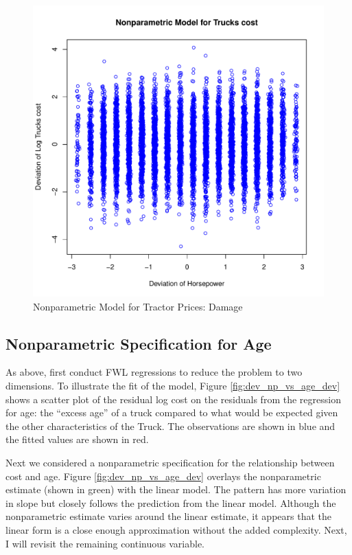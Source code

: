 \documentclass[11pt]{paper}
\begin{document}
\begin{figure}[h!]
  \centering
  \includegraphics[scale = 0.5, keepaspectratio=true]{../Figures/dev_np_vs_damage_dev}
  \caption{Nonparametric Model for Tractor Prices: Damage} \label{fig:dev_np_vs_damage_dev}
\end{figure}

 
\clearpage



\subsection{Nonparametric Specification for Age}

As above, first conduct FWL regressions 
to reduce the problem to two dimensions. 
% 
To illustrate the fit of the model, 
Figure \ref{fig:dev_np_vs_age_dev} 
shows a scatter plot 
of the residual log cost on 
the residuals from the regression for age:
the ``excess age'' of a truck compared to what would be 
expected given the other characteristics of the Truck. 
% 
The observations are shown in blue
and the fitted values are shown in red.

Next we considered a nonparametric specification for 
the relationship between cost and age.
% 
Figure \ref{fig:dev_np_vs_age_dev} 
overlays the nonparametric estimate (shown in green) 
with the linear model.
The pattern has more variation in slope but 
closely follows the prediction from the linear model. 
Although the nonparametric estimate varies around the linear estimate,
it appears that the linear form
is a close enough approximation without the added complexity.
Next, I will revisit the remaining continuous variable.
\end{document}
